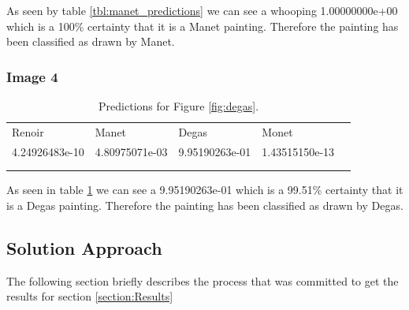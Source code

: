 As seen by table \ref{tbl:manet_predictions} we can see a whooping 1.00000000e+00 which is a 100\% certainty that it is a Manet painting. Therefore the painting has been classified as drawn by Manet.



\subsubsection*{Image 4}

\begin{table}[H]
    \centering
    \caption{Predictions for Figure \ref{fig:degas}.}
    \label{tbl:degas_predictions}
    \begin{tabular}{lllll}
    \cline{1-4}
    \multicolumn{1}{|l|}{Renoir}         & \multicolumn{1}{l|}{Manet}          & \multicolumn{1}{l|}{Degas}          & \multicolumn{1}{l|}{Monet}          &  \\ \cline{1-4}
    \multicolumn{1}{|l|}{4.24926483e-10} & \multicolumn{1}{l|}{4.80975071e-03} & \multicolumn{1}{l|}{9.95190263e-01} & \multicolumn{1}{l|}{1.43515150e-13} &  \\ \cline{1-4}
                                         &                                     &                                     &                                     &  \\
                                         &                                     &                                     &                                     & 
    \end{tabular}
\end{table}


As seen in table \ref{tbl:degas_predictions} we can see a 9.95190263e-01 which is a 99.51\% certainty that it is a Degas painting. Therefore the painting has been classified as drawn by Degas.





\subsection{Solution Approach}
The following section briefly describes the process that was committed to get the results for section \ref{section:Results}\\

